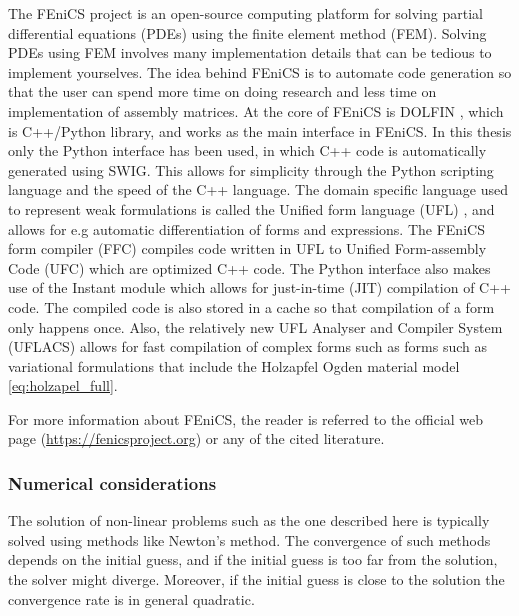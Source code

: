 The FEniCS project is an open-source computing platform for solving
partial differential equations (PDEs) using the finite element method (FEM).
Solving PDEs using FEM involves many implementation details that can
be tedious to implement yourselves. The idea behind FEniCS is to
automate code generation so that the user can spend more time on doing
research and less time on implementation of assembly matrices. At the
core of FEniCS is DOLFIN \cite{logg2012dolfin}, which is C++/Python
library, and works as the main interface in FEniCS. In this thesis
only the Python interface has been used, in which C++ code is
automatically generated using SWIG. This allows for simplicity through
the Python scripting language and the speed of the C++ language.
The domain specific language used to represent weak formulations is
called the Unified form language (UFL) \cite{alnaes2014unified}, and
allows for e.g automatic differentiation of forms and expressions. The
FEniCS form compiler (FFC) \cite{logg2012ffc} compiles code written in
UFL to Unified Form-assembly Code (UFC) \cite{alnaes2012ufc} which are
optimized C++ code. The Python interface also makes use of the Instant
module which allows for just-in-time (JIT) compilation of C++
code. The compiled code is also stored in a cache so that compilation
of a form only happens once. Also, the relatively new UFL Analyser and
Compiler System (UFLACS) allows for fast compilation of complex forms
such as forms such as variational formulations that include the Holzapfel
Ogden material model \eqref{eq:holzapel_full}.

For more information about FEniCS, the reader is referred to the
official web page (\url{https://fenicsproject.org}) or any of the
cited literature.

\subsubsection{Numerical considerations}
The solution of non-linear problems such as the one described here is
typically solved using methods like Newton's method. The convergence of
such methods depends on the initial guess, and if the
initial guess is too far from the solution, the solver might diverge.
Moreover, if the initial guess is close to the solution the
convergence rate is in general quadratic.

